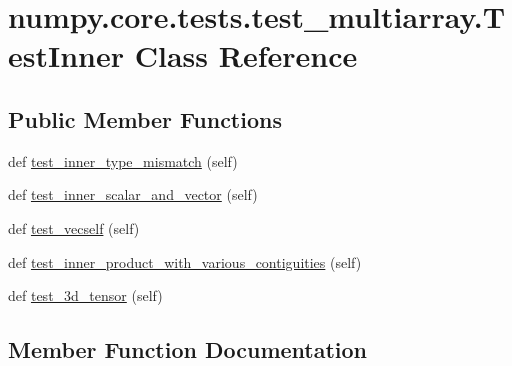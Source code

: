 \hypertarget{classnumpy_1_1core_1_1tests_1_1test__multiarray_1_1TestInner}{}\section{numpy.\+core.\+tests.\+test\+\_\+multiarray.\+Test\+Inner Class Reference}
\label{classnumpy_1_1core_1_1tests_1_1test__multiarray_1_1TestInner}
\subsection*{Public Member Functions}
\begin{DoxyCompactItemize}
\item 
def \hyperlink{classnumpy_1_1core_1_1tests_1_1test__multiarray_1_1TestInner_a1974dce13bb804b80d48a32e6595bc23}{test\+\_\+inner\+\_\+type\+\_\+mismatch} (self)
\item 
def \hyperlink{classnumpy_1_1core_1_1tests_1_1test__multiarray_1_1TestInner_a302b1b1521449b8a3905c3df30db808f}{test\+\_\+inner\+\_\+scalar\+\_\+and\+\_\+vector} (self)
\item 
def \hyperlink{classnumpy_1_1core_1_1tests_1_1test__multiarray_1_1TestInner_aa2ee067b419d429624c48dd3c2af0e48}{test\+\_\+vecself} (self)
\item 
def \hyperlink{classnumpy_1_1core_1_1tests_1_1test__multiarray_1_1TestInner_a5653c4451e016f7b50cfc99614cc7d27}{test\+\_\+inner\+\_\+product\+\_\+with\+\_\+various\+\_\+contiguities} (self)
\item 
def \hyperlink{classnumpy_1_1core_1_1tests_1_1test__multiarray_1_1TestInner_a1837aafa9528e4cc56f27f124ef3ae76}{test\+\_\+3d\+\_\+tensor} (self)
\end{DoxyCompactItemize}


\subsection{Member Function Documentation}
\mbox{\label{classnumpy_1_1core_1_1tests_1_1test__multiarray_1_1TestInner_a1837aafa9528e4cc56f27f124ef3ae76}} 
